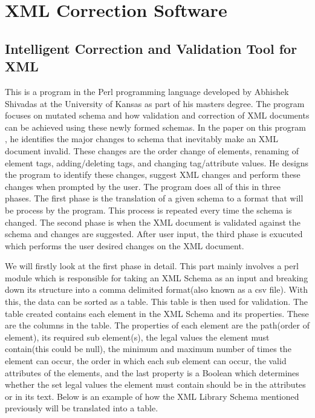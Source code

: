 \documentclass{report}
\begin{document}
\section{XML Correction Software}
\subsection{Intelligent Correction and Validation Tool for XML}
This is a program in the Perl programming language developed by Abhishek Shivadas \cite{shivadas2001intelligent} at the University of Kansas as part of his masters degree. The program focuses on mutated schema and how validation and correction of XML documents can be achieved using these newly formed schemas. In the paper on this program \cite{shivadas2001intelligent}, he identifies the major changes to schema that inevitably make an XML document invalid. These changes are the order change of elements, renaming of element tags, adding/deleting tags, and changing tag/attribute values. He designs the program to identify these changes, suggest XML changes  and perform these changes when prompted by the user. The program does all of this in three phases. The first phase is the translation  of a given schema to a format that will be process by the program. This process is repeated every time the schema is changed. The second phase is when the XML document is validated against the schema and changes are suggested. After user input, the third phase is exucuted which performs the user desired changes on the XML document. 

We will firstly look at the first phase in detail. This part mainly involves a perl module which is responsible for taking an XML Schema as an input and breaking down its structure into a comma delimited format(also known as a csv file). With this, the data can be sorted as a table. This table is then used for validation. The table created contains each element in the XML Schema and its properties. These are the columns in the table. The properties of each element are the path(order of element), its required sub element(s), the legal values the element must contain(this could be null), the minimum and maximum number of times the element can occur, the order in which each sub element can occur, the valid attributes of the elements, and the last property is a Boolean which determines whether the set legal values the element must contain should be in the attributes or in its text. Below is an example of how the XML Library Schema mentioned previously will be translated into a table. 
\end{document}
